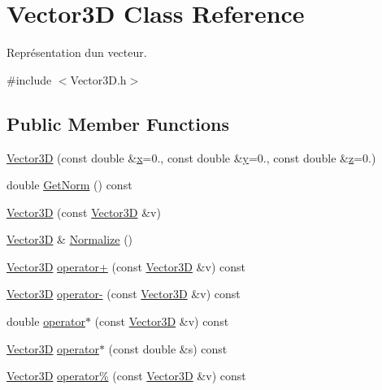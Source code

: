 \hypertarget{class_vector3_d}{}\section{Vector3\+D Class Reference}
\label{class_vector3_d}


Représentation d\textquotesingle{}un vecteur.  




{\ttfamily \#include $<$Vector3\+D.\+h$>$}

\subsection*{Public Member Functions}
\begin{DoxyCompactItemize}
\item 
\hyperlink{class_vector3_d_a31683a34920c7ea8def35f1d8703b70a}{Vector3\+D} (const double \&\hyperlink{class_vector3_d_a3c086dfccfc57dd996e9b8600098a430}{x}=0., const double \&\hyperlink{class_vector3_d_adcec384756103d26d1181e45d5a0fd78}{y}=0., const double \&\hyperlink{class_vector3_d_a7321f3ff785f275c4d83f7d1b951752a}{z}=0.)
\item 
double \hyperlink{class_vector3_d_a94b3f27d22cb524c5a8c83dff87533d6}{Get\+Norm} () const 
\item 
\hyperlink{class_vector3_d_a765ee7fc4bf9c338cb96fbd0499257a1}{Vector3\+D} (const \hyperlink{class_vector3_d}{Vector3\+D} \&v)
\item 
\hyperlink{class_vector3_d}{Vector3\+D} \& \hyperlink{class_vector3_d_a600c6993c7ff40ef1d543e93b8c7af3e}{Normalize} ()
\item 
\hyperlink{class_vector3_d}{Vector3\+D} \hyperlink{class_vector3_d_a9afe871c53a3edce04a13ba1386122a2}{operator+} (const \hyperlink{class_vector3_d}{Vector3\+D} \&v) const 
\item 
\hyperlink{class_vector3_d}{Vector3\+D} \hyperlink{class_vector3_d_aaf121384ca486a88570b29aba21c5972}{operator-\/} (const \hyperlink{class_vector3_d}{Vector3\+D} \&v) const 
\item 
double \hyperlink{class_vector3_d_a6e65d68b642260311346cdfc0ff05bd1}{operator$\ast$} (const \hyperlink{class_vector3_d}{Vector3\+D} \&v) const 
\item 
\hyperlink{class_vector3_d}{Vector3\+D} \hyperlink{class_vector3_d_a699b57c150f5bd153051f83dca94e685}{operator$\ast$} (const double \&s) const 
\item 
\hyperlink{class_vector3_d}{Vector3\+D} \hyperlink{class_vector3_d_aa55240977ab949ccf72d321c78f9b2d5}{operator\%} (const \hyperlink{class_vector3_d}{Vector3\+D} \&v) const 
\end{DoxyCompactItemize}
